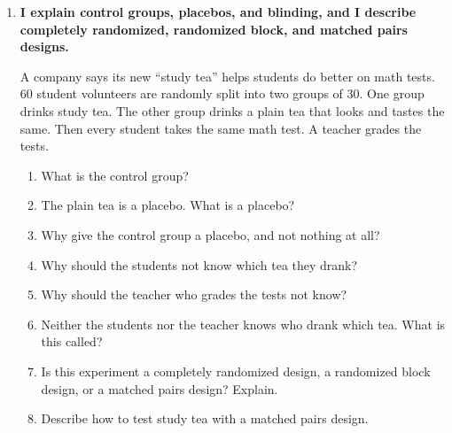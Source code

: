 \documentclass[11pt]{article}
\newcommand{\goal}[1]{\textbf{#1}\par\vspace{0.35em}}
\begin{document}
\begin{enumerate}[resume]
\begin{enumerate}[start=7,itemsep=1.5em]
  \work{4em}
\end{enumerate}

\newpage
\item \goal{I explain control groups, placebos, and blinding, and I describe completely randomized, randomized block, and matched pairs designs.}
A company says its new ``study tea'' helps students do better on math tests. 60 student volunteers are randomly split into two groups of 30. One group drinks study tea. The other group drinks a plain tea that looks and tastes the same. Then every student takes the same math test. A teacher grades the tests.
\begin{enumerate}[itemsep=1em]
  \item What is the control group? 
  \item The plain tea is a placebo. What is a placebo?

  \work{1.5em}
  \item Why give the control group a placebo, and not nothing at all?

  \work{3.5em}
  \item Why should the students not know which tea they drank?

  \work{3em}
  \item Why should the teacher who grades the tests not know?

  \work{3em}
  \item Neither the students nor the teacher knows who drank which tea. What is this called? 
  \work{2em}
  \item Is this experiment a completely randomized design, a randomized block design, or a matched pairs design? Explain.

  \work{3em}
  \item Describe how to test study tea with a matched pairs design.


\end{enumerate}
\end{enumerate}
\end{document}
